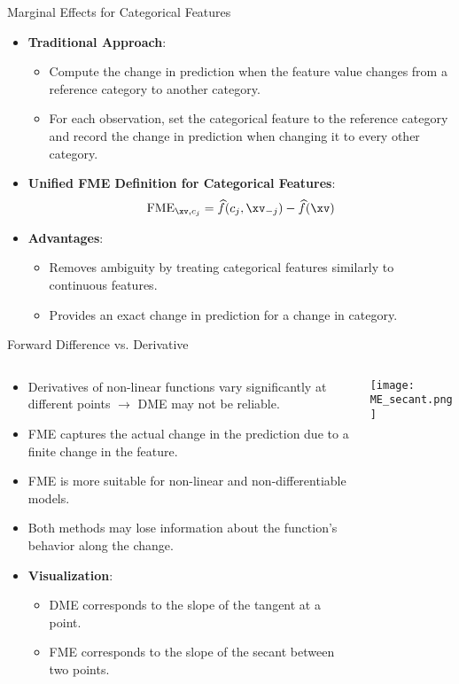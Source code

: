 \documentclass[11pt,compress,t,notes=noshow, aspectratio=169, xcolor=table]{beamer}
\begin{document}
\begin{frame}{Marginal Effects for Categorical Features}
\begin{itemize}
\item \textbf{Traditional Approach}:
\begin{itemize}
\item Compute the change in prediction when the feature value changes from a reference category to another category.
\item For each observation, set the categorical feature to the reference category and record the change in prediction when changing it to every other category.
\end{itemize}
\item \textbf{Unified FME Definition for Categorical Features}:
\[
\text{FME}_{\xv, c_j} = \widehat{f}(c_j, \xv_{-j}) - \widehat{f}(\xv)
\]
\item \textbf{Advantages}:
\begin{itemize}
\item Removes ambiguity by treating categorical features similarly to continuous features.
\item Provides an exact change in prediction for a change in category.
\end{itemize}
\end{itemize}
\end{frame}

\begin{frame}{Forward Difference vs. Derivative}
\begin{columns}[T]
\begin{column}{0.6\textwidth}
\begin{itemize}
\item Derivatives of non-linear functions vary significantly at different points $\rightarrow$ DME may not be reliable.
\item FME captures the actual change in the prediction due to a finite change in the feature.
\item FME is more suitable for non-linear and non-differentiable models.
\item Both methods may lose information about the function's behavior along the change.
\item \textbf{Visualization}:
\begin{itemize}
\item DME corresponds to the slope of the tangent at a point.
\item FME corresponds to the slope of the secant between two points.
\end{itemize}
\end{itemize}
\end{column}
\begin{column}{0.4\textwidth}
\texttt{[image: ME\_secant.png]}
\end{column}
\end{columns}
\end{frame}
\end{document}
